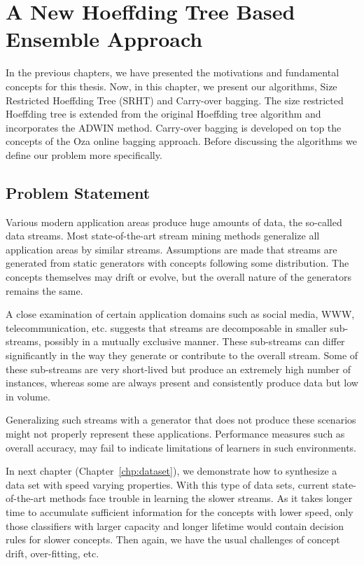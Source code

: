 \chapter{A New Hoeffding Tree Based Ensemble Approach}
\label{chp:algo}
In the previous chapters, we have presented the motivations and fundamental concepts for this thesis. Now, in this chapter, we present our algorithms, Size Restricted Hoeffding Tree (SRHT) and Carry-over bagging. The size restricted Hoeffding tree is extended from the original Hoeffding tree algorithm and incorporates the ADWIN method. Carry-over bagging is developed on top the concepts of the Oza online bagging approach. 
Before discussing the algorithms we define our problem more specifically. 

\section{Problem Statement}
Various modern application areas produce huge amounts of data, the so-called data streams. Most state-of-the-art stream mining methods generalize all application areas by similar streams. Assumptions are made that streams are generated from static generators with concepts following some distribution. The concepts themselves may drift or evolve, but the overall nature of the generators remains the same.

A close examination of certain application domains such as social media, WWW, telecommunication, etc. suggests that streams are decomposable in smaller sub-streams, possibly in a mutually exclusive manner. These sub-streams  can differ significantly in the way they generate or contribute to the overall stream. Some of these sub-streams are very short-lived but produce an extremely high number of instances, whereas some are always present and consistently produce data but low in volume.

Generalizing such streams with a generator that does not produce these scenarios might not properly represent these applications. Performance measures such as overall accuracy, may fail to indicate limitations of learners in such environments.

In next chapter (Chapter~\ref{chp:dataset}), we demonstrate how to synthesize a data set with speed varying properties. With this type of data sets, current state-of-the-art methods face trouble in learning the slower streams. As it takes longer time to accumulate sufficient information for the concepts with lower speed, only those classifiers with larger capacity and longer lifetime would contain decision rules for slower concepts. Then again, we have the usual challenges of concept drift, over-fitting, etc.

